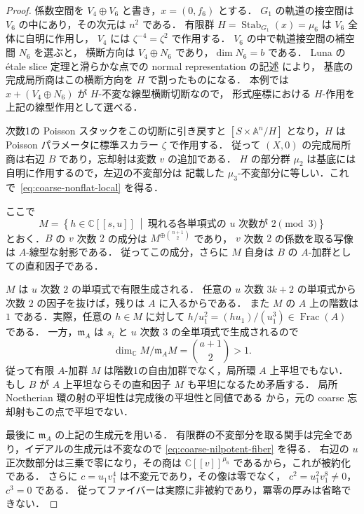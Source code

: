 \begin{proof}
係数空間を $V_4\oplus V_6$ と書き，$x=(0,f_6)$ とする．
$G_1$ の軌道の接空間は $V_6$ の中にあり，その次元は $n^2$ である．
有限群 $H=\operatorname{Stab}_{G_1}(x)=\mu_6$ は $V_6$ 全体に自明に作用し，
$V_4$ には $\zeta^{-4}=\zeta^2$ で作用する．
$V_6$ の中で軌道接空間の補空間 $N_6$ を選ぶと，
横断方向は $V_4\oplus N_6$ であり，$\dim N_6=b$ である．
Luna の \'{e}tale slice 定理と滑らかな点での normal representation の記述
\cite[III, \S1, Th\'eor\`eme and Remarque~1]{Luna1973} により，
基底の完成局所商はこの横断方向を $H$ で割ったものになる．
本例では $x+(V_4\oplus N_6)$ が $H$-不変な線型横断切断なので，
形式座標における $H$-作用を上記の線型作用として選べる．

次数1の Poisson スタックをこの切断に引き戻すと
$[S\times\mathbb A^n/H]$ となり，$H$ は Poisson パラメータに標準スカラー $\zeta$ で作用する．
従って $(X,0)$ の完成局所商は右辺 $B$ であり，忘却射は変数 $v$ の追加である．
$H$ の部分群 $\mu_2$ は基底には自明に作用するので，左辺の不変部分は
記載した $\mu_3$-不変部分に等しい．これで~\eqref{eq:coarse-nonflat-local} を得る．

ここで
\[
 M=\left\{h\in\mathbb C[[s,u]]\ \middle|\ %
 \text{現れる各単項式の }u\text{ 次数が }2\pmod3\right\}
\]
とおく．$B$ の $v$ 次数 $2$ の成分は $M^{\oplus\binom{n+1}{2}}$ であり，
$v$ 次数 $2$ の係数を取る写像は $A$-線型な射影である．
従ってこの成分，さらに $M$ 自身は $B$ の $A$-加群としての直和因子である．

$M$ は $u$ 次数 $2$ の単項式で有限生成される．
任意の $u$ 次数 $3k+2$ の単項式から次数 $2$ の因子を抜けば，残りは $A$ に入るからである．
また $M$ の $A$ 上の階数は $1$ である．実際，任意の $h\in M$ に対して
$h/u_1^2=(hu_1)/(u_1^3)\in\operatorname{Frac}(A)$ である．
一方，$\mathfrak m_A$ は $s_i$ と $u$ 次数 $3$ の全単項式で生成されるので
\[
 \dim_{\mathbb C} M/\mathfrak m_A M=\binom{a+1}{2}>1.
\]
従って有限 $A$-加群 $M$ は階数1の自由加群でなく，局所環 $A$ 上平坦でもない．
もし $B$ が $A$ 上平坦ならその直和因子 $M$ も平坦になるため矛盾する．
局所 Noetherian 環の射の平坦性は完成後の平坦性と同値である
\cite[Tag 0C4G]{StacksProject} から，元の coarse 忘却射もこの点で平坦でない．

最後に $\mathfrak m_A$ の上記の生成元を用いる．
有限群の不変部分を取る関手は完全であり，イデアルの生成元は不変なので
\eqref{eq:coarse-nilpotent-fiber} を得る．
右辺の $u$ 正次数部分は三乗で零になり，その商は
$\mathbb C[[v]]^{\mu_6}$ であるから，これが被約化である．
さらに $c=u_1v_1^4$ は不変元であり，その像は零でなく，
$c^2=u_1^2v_1^8\ne0$，$c^3=0$ である．
従ってファイバーは実際に非被約であり，冪零の厚みは省略できない．
\end{proof}


